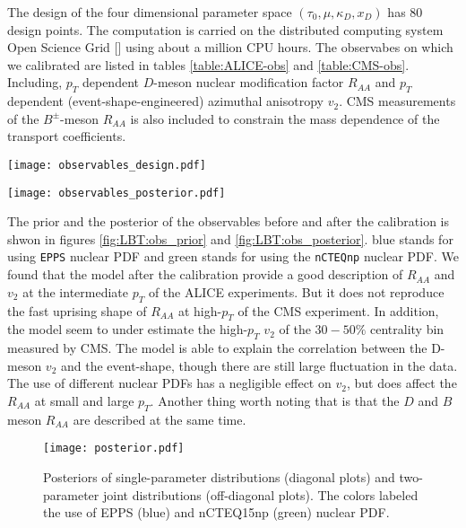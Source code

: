 The design of the four dimensional parameter space  $(\tau_0, \mu, \kappa_D, x_D)$ has 80 design points.
The computation is carried on the distributed computing system Open Science Grid [] using about a million CPU hours.
The observabes on which we calibrated are listed in tables \ref{table:ALICE-obs} and \ref{table:CMS-obs}. 
Including, $p_T$ dependent $D$-meson nuclear modification factor $R_{AA}$ and $p_T$ dependent (event-shape-engineered) azimuthal anisotropy $v_2$.
CMS measurements of the $B^{\pm}$-meson $R_{AA}$ is also included to constrain the mass dependence of the transport coefficients.

\begin{figure*}
\texttt{[image: observables\_design.pdf]}
\caption{The prior distribution of observables compared to data. The colors labeled the use of EPPS (blue) and nCTEQ15np (green) nuclear PDF.}
\label{fig:LBT:obs_prior}
\end{figure*}

\begin{figure*}
\texttt{[image: observables\_posterior.pdf]}
\caption{The 90\% credible region of the posterior distribution of observables compared to data. The colors labeled the use of EPPS (blue) and nCTEQ15np (green) nuclear PDF.}
\label{fig:LBT:obs_posterior}
\end{figure*}

The prior and the posterior of the observables before and after the calibration is shwon in figures \ref{fig:LBT:obs_prior} and \ref{fig:LBT:obs_posterior}.
blue stands for using {\tt EPPS} nuclear PDF and green stands for using the {\tt nCTEQnp}  nuclear PDF.
We found that the model after the calibration provide a good description of $R_{AA}$ and $v_2$ at the intermediate $p_T$ of the ALICE experiments.
But it does not reproduce the fast uprising shape of $R_{AA}$ at high-$p_T$ of the CMS experiment.
In addition, the model seem to under estimate the high-$p_T$ $v_2$ of the $30-50\%$ centrality bin measured by CMS.
The model is able to explain the correlation between the D-meson $v_2$ and the event-shape, though there are still large fluctuation in the data.
The use of different nuclear PDFs has a negligible effect on $v_2$, but does affect the $R_{AA}$ at small and large $p_T$.
Another thing worth noting that is that the $D$ and $B$ meson $R_{AA}$ are described at the same time.

\begin{figure}
\centering
\texttt{[image: posterior.pdf]}
\caption{Posteriors of single-parameter distributions (diagonal plots) and two-parameter joint distributions (off-diagonal plots). The colors labeled the use of EPPS (blue) and nCTEQ15np (green) nuclear PDF.}
\label{fig:LBT:posterior}
\end{figure}


